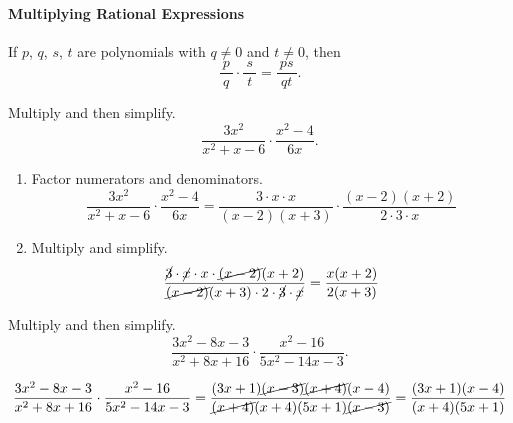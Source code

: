 \paragraph*{Multiplying Rational Expressions}
	If $p$, $q$, $s$, $t$ are polynomials with $q\neq 0$ and $t\neq 0$, then
	\[
		\dfrac{~p~}{~q~}\cdot\dfrac{~s~}{~t~}=\dfrac{~ps~}{~qt~}.
	\]
	\vspace{-0.5\baselineskip}
		\begin{example}
			Multiply and then simplify.
			\[\dfrac{3x^2}{x^2+x-6}\cdot\dfrac{x^2-4}{6x}.\]
		\end{example}
\vspace*{-0.25\baselineskip}
		\begin{solution}\mbox{}
			\begin{enumerate}[label={\textbf{\textup{Step \arabic*.}}~}]
				\item Factor numerators and denominators. 
				      \[
					      \dfrac{3x^2}{x^2+x-6}\cdot\dfrac{x^2-4}{6x}=\dfrac{3\cdot x\cdot x}{(x-2)(x+3)}\cdot\dfrac{(x-2)(x+2)}{2\cdot3\cdot x}
				      \]
				\item Multiply and simplify.
				      \[
					      \dfrac{\cancel{3}\cdot \cancel{x}\cdot x\cdot\cancel{(x-2)}(x+2)}{\cancel{(x-2)}(x+3)\cdot 2\cdot\cancel{3}\cdot \cancel{x}}=\dfrac{x(x+2)}{2(x+3)}
				      \]
			\end{enumerate}
		\end{solution}
		




		\begin{example}
			Multiply and then simplify.
			\[
				\dfrac{3x^2-8x-3}{x^2+8x+16}\cdot\dfrac{x^2-16}{5x^2-14x-3}.
			\]
		\end{example}
		\vspace*{-0.25\baselineskip}
		\begin{solution}
			\[
				\dfrac{3x^2-8x-3}{x^2+8x+16}\cdot\dfrac{x^2-16}{5x^2-14x-3}
					=\dfrac{(3x+1)\cancel{(x-3)}\cancel{(x+4)}(x-4)}{\cancel{(x+4)}(x+4)(5x+1)\cancel{(x-3)}}
					=\dfrac{(3x+1)(x-4)}{(x+4)(5x+1)}
			\]
		\end{solution}

